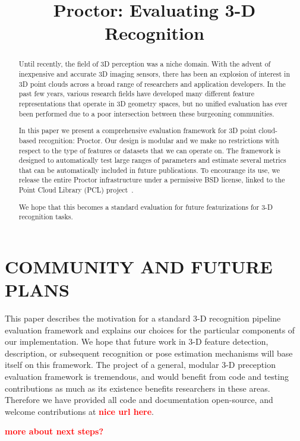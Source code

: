 \documentclass[a4paper, 10pt, conference]{ieeeconf}      %
\title{\LARGE \bf
Proctor: Evaluating 3-D Recognition
}
\newcommand{\note}[1]{\textcolor{red}{\textbf{#1}}}
\begin{document}
\maketitle
\thispagestyle{empty}
\pagestyle{empty}

\begin{abstract}


Until recently, the field of 3D perception was a niche domain. With the advent
of inexpensive and accurate 3D imaging sensors, there has been an explosion of
interest in 3D point clouds across a broad range of researchers and application
developers. In the past few years, various research fields have developed
many different feature representations that operate in 3D geometry spaces, but
no unified evaluation has ever been performed due to a poor intersection between
these burgeoning communities.

In this paper we present a comprehensive evaluation framework for 3D point
cloud-based recognition: Proctor. Our design is modular and we make no
restrictions with respect to the type of features or datasets that we can
operate on. The framework is designed to automatically test large ranges of
parameters and estimate several metrics that can be automatically included in
future publications. To encourange its use, we release the entire Proctor
infrastructure under a permissive BSD license, linked to the Point Cloud
Library (PCL) project~\cite{PCL}.


We hope that this becomes a standard evaluation for future featurizations for
3-D recognition tasks.

\end{abstract}







\section{COMMUNITY AND FUTURE PLANS}

This paper describes the motivation for a standard 3-D recognition pipeline evaluation framework and explains our choices for the particular components of our implementation.
We hope that future work in 3-D feature detection, description, or subsequent recognition or pose estimation mechanisms will base itself on this framework.
The project of a general, modular 3-D preception evaluation framework is tremendous, and would benefit from code and testing contributions as much as its existence benefits researchers in these areas.
Therefore we have provided all code and documentation open-source, and welcome contributions at \note{nice url here}.

\note{more about next steps?}

% 

{\small


}
\end{document}
